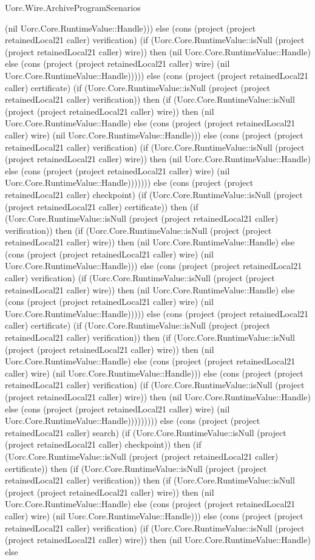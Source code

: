 \begin{lexlean}{Uorc.Wire.ArchiveProgramScenarios}
\begin{semanticmodule}
{(nil Uorc.Core.RuntimeValue::Handle))) else (cons (project (project retainedLocal21 caller) verification) (if (Uorc.Core.RuntimeValue::isNull (project (project retainedLocal21 caller) wire)) then (nil Uorc.Core.RuntimeValue::Handle) else (cons (project (project retainedLocal21 caller) wire) (nil Uorc.Core.RuntimeValue::Handle))))) else (cons (project (project retainedLocal21 caller) certificate) (if (Uorc.Core.RuntimeValue::isNull (project (project retainedLocal21 caller) verification)) then (if (Uorc.Core.RuntimeValue::isNull (project (project retainedLocal21 caller) wire)) then (nil Uorc.Core.RuntimeValue::Handle) else (cons (project (project retainedLocal21 caller) wire) (nil Uorc.Core.RuntimeValue::Handle))) else (cons (project (project retainedLocal21 caller) verification) (if (Uorc.Core.RuntimeValue::isNull (project (project retainedLocal21 caller) wire)) then (nil Uorc.Core.RuntimeValue::Handle) else (cons (project (project retainedLocal21 caller) wire) (nil Uorc.Core.RuntimeValue::Handle))))))) else (cons (project (project retainedLocal21 caller) checkpoint) (if (Uorc.Core.RuntimeValue::isNull (project (project retainedLocal21 caller) certificate)) then (if (Uorc.Core.RuntimeValue::isNull (project (project retainedLocal21 caller) verification)) then (if (Uorc.Core.RuntimeValue::isNull (project (project retainedLocal21 caller) wire)) then (nil Uorc.Core.RuntimeValue::Handle) else (cons (project (project retainedLocal21 caller) wire) (nil Uorc.Core.RuntimeValue::Handle))) else (cons (project (project retainedLocal21 caller) verification) (if (Uorc.Core.RuntimeValue::isNull (project (project retainedLocal21 caller) wire)) then (nil Uorc.Core.RuntimeValue::Handle) else (cons (project (project retainedLocal21 caller) wire) (nil Uorc.Core.RuntimeValue::Handle))))) else (cons (project (project retainedLocal21 caller) certificate) (if (Uorc.Core.RuntimeValue::isNull (project (project retainedLocal21 caller) verification)) then (if (Uorc.Core.RuntimeValue::isNull (project (project retainedLocal21 caller) wire)) then (nil Uorc.Core.RuntimeValue::Handle) else (cons (project (project retainedLocal21 caller) wire) (nil Uorc.Core.RuntimeValue::Handle))) else (cons (project (project retainedLocal21 caller) verification) (if (Uorc.Core.RuntimeValue::isNull (project (project retainedLocal21 caller) wire)) then (nil Uorc.Core.RuntimeValue::Handle) else (cons (project (project retainedLocal21 caller) wire) (nil Uorc.Core.RuntimeValue::Handle))))))))) else (cons (project (project retainedLocal21 caller) search) (if (Uorc.Core.RuntimeValue::isNull (project (project retainedLocal21 caller) checkpoint)) then (if (Uorc.Core.RuntimeValue::isNull (project (project retainedLocal21 caller) certificate)) then (if (Uorc.Core.RuntimeValue::isNull (project (project retainedLocal21 caller) verification)) then (if (Uorc.Core.RuntimeValue::isNull (project (project retainedLocal21 caller) wire)) then (nil Uorc.Core.RuntimeValue::Handle) else (cons (project (project retainedLocal21 caller) wire) (nil Uorc.Core.RuntimeValue::Handle))) else (cons (project (project retainedLocal21 caller) verification) (if (Uorc.Core.RuntimeValue::isNull (project (project retainedLocal21 caller) wire)) then (nil Uorc.Core.RuntimeValue::Handle) else }
\end{semanticmodule}
\end{lexlean}
